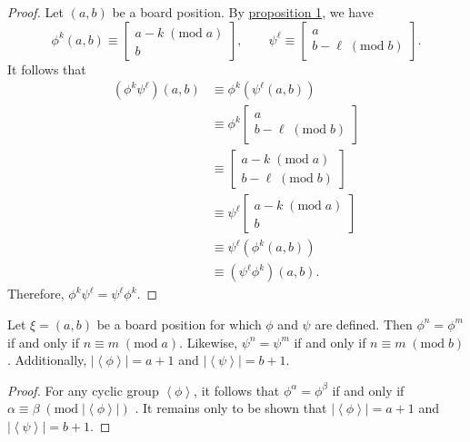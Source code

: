 \documentclass[11pt, letterpaper]{article}
\renewcommand{\mod}[1]{\;(\text{mod}\;#1)}
\begin{document}
\begin{proof}
	Let $(a,b)$ be a board position. By \hyperref[prp:1]{proposition 1}, we have
	\[
		\phi ^k(a,b)\equiv \begin{bmatrix} a-k\mod{a} \\ b \end{bmatrix} ,\qquad \psi ^\ell \equiv \begin{bmatrix} a \\ b-\ell \mod{b} \end{bmatrix} 
	.\]
	It follows that
	\begin{align*}
		\left( \phi ^k\psi ^\ell  \right) (a,b)&\equiv \phi ^k\left( \psi ^\ell (a,b) \right)\\
						       &\equiv \phi ^k \begin{bmatrix} a \\ b-\ell \mod{b} \end{bmatrix}  \\
						       &\equiv \begin{bmatrix} a-k\mod{a} \\ b-\ell \mod{b} \end{bmatrix} \\
						       &\equiv \psi ^\ell \begin{bmatrix} a-k\mod{a} \\ b \end{bmatrix} \\
						&\equiv \psi ^\ell \left( \phi ^k(a,b) \right) \\
						&\equiv \left( \psi ^\ell \phi ^k \right) (a,b)
	.\end{align*}
	Therefore, $\phi ^k\psi ^\ell =\psi ^\ell \phi ^k$.
\end{proof}
\begin{lemma}\label{lma:2}
	Let $\xi =(a,b)$ be a board position for which $\phi $ and $\psi $ are defined. Then $\phi ^n=\phi ^m$ if and only if $n\equiv m\mod{a}$. Likewise, $\psi ^n=\psi ^m$ if and only if $n\equiv m\mod{b}$. Additionally, $\left| \left<\phi  \right> \right| =a+1$ and $\left| \left<\psi  \right> \right| =b+1$.
\end{lemma}
\begin{proof}
	For any cyclic group $\left<\phi  \right>$, it follows that $\phi ^\alpha =\phi ^\beta $ if and only if $\alpha \equiv \beta \mod{\left| \left<\phi  \right> \right|} $ \cite{gallian, judson}. It remains only to be shown that $\left| \left<\phi  \right> \right| =a+1$ and $\left| \left<\psi  \right> \right| =b+1$.
\end{proof}
\end{document}
